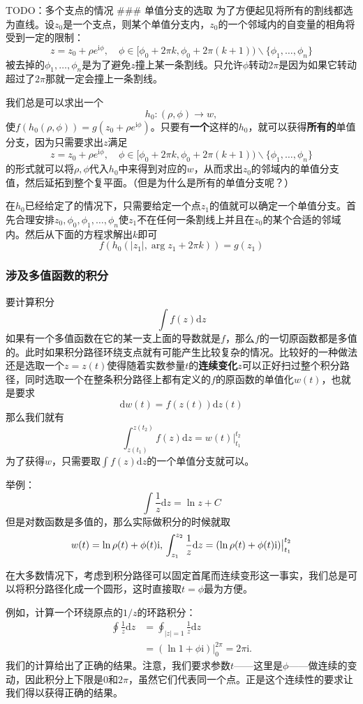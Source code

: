 TODO：多个支点的情况 \#\#\# 单值分支的选取
为了方便起见将所有的割线都选为直线。设$z_0$是一个支点，则某个单值分支内，$z_0$的一个邻域内的自变量的相角将受到一定的限制：
\[
z = z_0 + \rho e^{\mathrm{i} \phi}, \quad \phi \in [\phi_0 + 2\pi k, \phi_0 + 2 \pi (k+1)) \backslash \{ \phi_1, \ldots, \phi_n \}
\]
被去掉的$\phi_1, \ldots, \phi_n$是为了避免$z$撞上某一条割线。只允许$\phi$转动$2\pi$是因为如果它转动超过了$2\pi$那就一定会撞上一条割线。

我们总是可以求出一个 \[
h_0: (\rho, \phi) \longrightarrow w, 
\]
使$f(h_0(\rho, \phi)) = g(z_0 + \rho e^{\mathrm{i}\phi})$。只要有\textbf{一个}这样的$h_0$，就可以获得\textbf{所有的}单值分支，因为只需要求出$z$满足
\[
z = z_0 + \rho e^{\mathrm{i} \phi}, \quad \phi \in [\phi_0 + 2\pi k, \phi_0 + 2 \pi (k+1)) \backslash \{ \phi_1, \ldots, \phi_n \}
\]
的形式就可以将$\rho, \phi$代入$h_0$中来得到对应的$w$，从而求出$z_0$的邻域内的单值分支值，然后延拓到整个复平面。（但是为什么是所有的单值分支呢？）

在$h_0$已经给定了的情况下，只需要给定一个点$z_1$的值就可以确定一个单值分支。首先合理安排$z_0, \phi_0, \phi_1, \ldots, \phi_n$使$z_1$不在任何一条割线上并且在$z_0$的某个合适的邻域内。然后从下面的方程求解出$k$即可
\[
f(h_0(|z_1|, \arg z_1 + 2\pi k)) = g(z_1)
\]

\hypertarget{ux6d89ux53caux591aux503cux51fdux6570ux7684ux79efux5206}{%
\subsubsection{涉及多值函数的积分}\label{ux6d89ux53caux591aux503cux51fdux6570ux7684ux79efux5206}}

要计算积分 \[
\int f(z) \mathrm{d}z
\]
如果有一个多值函数在它的某一支上面的导数就是$f$，那么$f$的一切原函数都是多值的。此时如果积分路径环绕支点就有可能产生比较复杂的情况。比较好的一种做法还是选取一个$z=z(t)$使得随着实数参量$t$的\textbf{连续变化}$z$可以正好扫过整个积分路径，同时选取一个在整条积分路径上都有定义的$f$的原函数的单值化$w(t)$，也就是要求
\[
\mathrm{d} w(t) = f(z(t)) \mathrm{d} z(t)
\] 那么我们就有 \[
\int_{z(t_1)}^{z(t_2)} f(z) \mathrm{d}z = w(t) \big |_{t_1}^{t_2}
\]
为了获得$w$，只需要取$\int f(z) \mathrm{d}z$的一个单值分支就可以。

举例： \[
\int \frac{1}{z} \mathrm{d}z = \ln z + C
\] 但是对数函数是多值的，那么实际做积分的时候就取 \[
w(t) = \ln \rho (t) + \phi (t) \mathrm{i}, \\
\int_{z_1}^{z_2} \frac{1}{z} \mathrm{d}z = (\ln \rho (t) + \phi (t) \mathrm{i}) \big |_{t_1}^{t_2}
\]

在大多数情况下，考虑到积分路径可以固定首尾而连续变形这一事实，我们总是可以将积分路径化成一个圆形，这时直接取$t=\phi$最为方便。

例如，计算一个环绕原点的$1/z$的环路积分： \[
\begin{aligned}
    \oint \frac{1}{z} \mathrm{d}z &= \oint_{|z|=1} \frac{1}{z} \mathrm{d}z \\
    &= (\ln 1 + \phi \mathrm{i}) \big |_0^{2\pi} = 2 \pi \mathrm{i}.
\end{aligned}
\]
我们的计算给出了正确的结果。注意，我们要求参数$t$------这里是$\phi$------做连续的变动，因此积分上下限是0和$2\pi$，虽然它们代表同一个点。正是这个连续性的要求让我们得以获得正确的结果。
